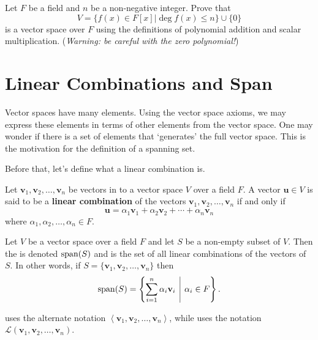 \begin{exercise}
    Let $F$ be a field and $n$ be a non-negative integer. Prove that
    \[
        V = \{f(x) \in F[x] \vert \deg f(x) \leq n\} \cup \{0\}
    \]
    is a vector space over $F$ using the definitions of polynomial addition and scalar multiplication.\newline
    (\textit{Warning: be careful with the zero polynomial!})
\end{exercise}

\section{Linear Combinations and Span}
Vector spaces have many elements. Using the vector space axioms, we may express these elements in terms of other elements from the vector space. One may wonder if there is a set of elements that `generates' the full vector space. This is the motivation for the definition of a spanning set.

Before that, let's define what a linear combination is.
\begin{definition}
    Let $\textbf{v}_1, \textbf{v}_2, \dots, \textbf{v}_n$ be vectors in to a vector space $V$ over a field $F$. A vector $\textbf{u} \in V$ is said to be a \textbf{linear combination} of the vectors $\textbf{v}_1, \textbf{v}_2, \dots, \textbf{v}_n$ if and only if
    \[
        \textbf{u} = \alpha_1\textbf{v}_1 + \alpha_2\textbf{v}_2 + \cdots + \alpha_n \textbf{v}_n
    \]
    where $\alpha_1, \alpha_2, \dots, \alpha_n \in F$.
\end{definition}

\begin{definition}
    Let $V$ be a vector space over a field $F$ and let $S$ be a non-empty subset of $V$. Then the  is denoted $\mathrm{span}(S)$ and is the set of all linear combinations of the vectors of $S$. In other words, if $S = \{\textbf{v}_1, \textbf{v}_2, \dots, \textbf{v}_n\}$ then
    \[
        \Span{S} = \left\{\sum_{i=1}^n \alpha_i\textbf{v}_i \vert \alpha_i \in F\right\}.
    \]
\end{definition}
\begin{remark}
    \cite[p.~331]{gallian_2016} uses the alternate notation $\left\langle\textbf{v}_1, \textbf{v}_2, \dots, \textbf{v}_n\right\rangle$, while \cite[p.~31]{treil_2017} uses the notation $\mathcal{L}\left(\textbf{v}_1, \textbf{v}_2, \dots, \textbf{v}_n\right)$.
\end{remark}

